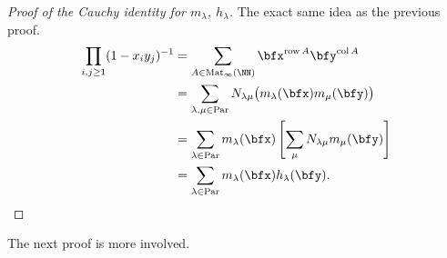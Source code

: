 \documentclass{article}
\DeclareMathOperator{\row}{row}
\DeclareMathOperator{\col}{col}
\DeclareMathOperator{\Par}{Par}
\DeclareMathOperator{\Mat}{Mat}
\begin{document}
\begin{proof}
    [Proof of the Cauchy identity for $m_\lambda$, $h_\lambda$]
    The exact same idea as the previous proof.
    \begin{align*}
        \prod_{i,j\geq1}(1-x_iy_j)^{-1} 
        &= 
        \sum_{A \in \Mat_\infty(\NN)}
        \bfx^{\row A}\bfy^{\col A} 
        \\
        &= 
        \sum_{\lambda,\mu\in\Par} N_{\lambda\mu} 
        \big(m_\lambda(\bfx) m_\mu(\bfy)\big) 
        \\
        &= 
        \sum_{\lambda\in\Par} 
        m_\lambda(\bfx) 
        \left[
            \sum_\mu N_{\lambda\mu} m_\mu(\bfy)
        \right]
        \\
        &= 
        \sum_{\lambda\in\Par} 
        m_\lambda(\bfx) h_\lambda(\bfy).
    \end{align*}
\end{proof}

The next proof is more involved.
\end{document}
